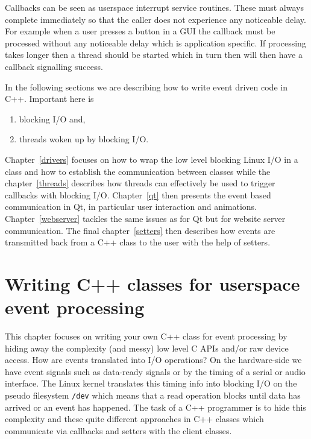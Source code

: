 \documentclass[12pt]{report}
\begin{document}
Callbacks can be seen as userspace interrupt service routines.
These must always complete immediately so that the caller does
not experience any noticeable delay. For example when a user
presses a button in a GUI the callback must be
processed without any noticeable delay which is application specific.
If processing takes
longer then a thread should be started which in turn then will
then have a callback signalling success.

In the following sections we are describing how to write event driven
code in C++. Important here is
\begin{enumerate}
\item blocking I/O and,
\item threads woken up by blocking I/O.
\end{enumerate}
Chapter~\ref{drivers} focuses on how to wrap the low
level blocking Linux I/O in a class and how to establish the
communication between classes while the chapter~\ref{threads}
describes how threads can effectively be used to trigger callbacks
with blocking I/O. Chapter~\ref{qt} then presents the event based
communication in Qt, in particular user interaction and animations.
Chapter~\ref{webserver} tackles the same issues as for Qt but for
website server communication. The final chapter~\ref{setters} then
describes how events are transmitted back from a C++ class to the user
with the help of setters.


\chapter{Writing C++ classes for userspace event processing\label{drivers}}
This chapter focuses on writing your own C++ class for event processing by
hiding away the complexity (and messy) low level C APIs and/or raw
device access. How are events translated into I/O operations? On the
hardware-side we have event signals such as data-ready signals or by
the timing of a serial or audio interface. The Linux kernel translates
this timing info into blocking I/O on the pseudo filesystem \texttt{/dev}
which means that a read operation blocks until data has arrived
or an event has happened. The task of a C++ programmer is
to hide this complexity and these quite different approaches in C++
classes which communicate via callbacks and setters with the client
classes.
\end{document}
